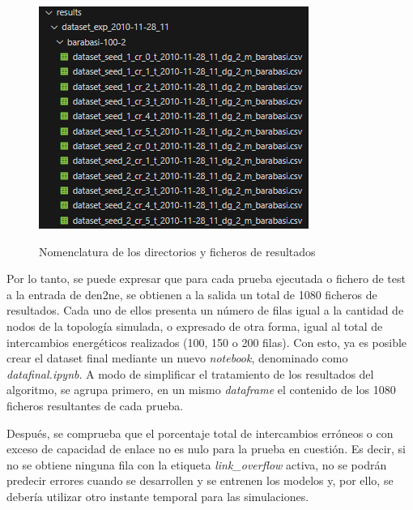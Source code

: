 \begin{figure}[h!]
\begin{minipage}{0.6\textwidth}
      \includegraphics[width=\linewidth]{img/diseno/dirpruebas.png}
      \label{fig:dirpruebas}
    \end{minipage}\hfill
    \caption{Nomenclatura de los directorios y ficheros de resultados}
    \label{fig:dirnombres}
\end{figure}

\pagebreak

Por lo tanto, se puede expresar que para cada prueba ejecutada o fichero de test a la entrada de \gls{den2ne}, se obtienen a la salida un total de 1080 ficheros de resultados. Cada uno de ellos presenta un número de filas igual a la cantidad de nodos de la topología simulada, o expresado de otra forma, igual al total de intercambios energéticos realizados (100, 150 o 200 filas). Con esto, ya es posible crear el dataset final mediante un nuevo \textit{notebook}, denominado como \textit{datafinal.ipynb}. A modo de simplificar el tratamiento de los resultados del algoritmo, se agrupa primero, en un mismo \textit{dataframe} el contenido de los 1080 ficheros resultantes de cada prueba. 

\vspace{3mm}

Después, se comprueba que el porcentaje total de intercambios erróneos o con exceso de capacidad de enlace no es nulo para la prueba en cuestión. Es decir, si no se obtiene ninguna fila con la etiqueta \textit{link\_overflow} activa, no se podrán predecir errores cuando se desarrollen y se entrenen los modelos y, por ello, se debería utilizar otro instante temporal para las simulaciones. 

